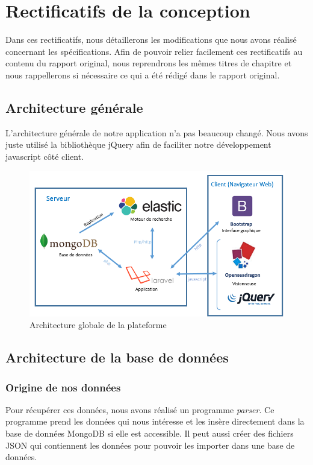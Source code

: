 \section{Rectificatifs de la conception}
\label{sec:majconc}

Dans ces rectificatifs, nous détaillerons les modifications que nous avons réalisé concernant les spécifications\cite{Specs}. Afin de pouvoir relier facilement ces rectificatifs au contenu du rapport original, nous reprendrons les mêmes titres de chapitre et nous rappellerons si nécessaire ce qui a été rédigé dans le rapport original. 

\subsection{Architecture générale}

L'architecture générale de notre application n'a pas beaucoup changé. Nous avons juste utilisé la bibliothèque jQuery afin de faciliter notre développement javascript côté client.

    \begin{figure}[H]
        \centering
        \includegraphics[width=\textwidth]{figure/Archi.png}
            \caption{Architecture globale de la plateforme}
            \label{archi}
    \end{figure}
		
\subsection{Architecture de la base de données}

\subsubsection{Origine de nos données}

 \begin{leftonly}
  Pour récupérer ces données, nous avons réalisé un programme \textit{parser}. Ce programme prend les données
qui nous intéresse et les insère directement dans la base de données MongoDB si elle est accessible.
Il peut aussi créer des fichiers JSON qui contiennent les données pour pouvoir les importer dans
une base de données.
 \end{leftonly}

